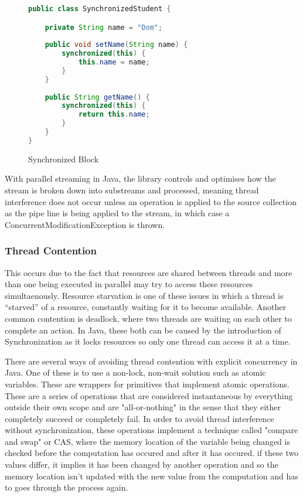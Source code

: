 \documentclass[]{report}
\begin{document}
\begin{figure}[h!]
\caption{Synchronized Block}
\begin{lstlisting}[language=Java,frame=single]
public class SynchronizedStudent {

	private String name = "Dom";
	
	public void setName(String name) {
		synchronized(this) {
			this.name = name;
		}
	}
	
	public String getName() {
		synchronized(this) {
			return this.name;
		}
	}
}
\end{lstlisting}
\end{figure}
 
With parallel streaming in Java, the library controls and optimises how the stream is broken down into substreams and processed, meaning thread interference does not occur unless an operation is applied to the source collection as the pipe line is being applied to the stream, in which case a ConcurrentModificationException is thrown.\cite{Streaming Fork Join}

\subsubsection{Thread Contention} 
This occurs due to the fact that resources are shared between threads and more than one  being executed in parallel may try to access these resources simultaenously. Resource starvation is one of these issues in which a thread is “starved” of a resource, constantly waiting for it to become available\cite{Starvation}. Another common contention is deadlock, where two threads are waiting on each other to complete an action. In Java, these both can be caused by the introduction of Synchronization as it locks resources so only one thread can access it at a time.\cite{Synchronization}

There are several ways of avoiding thread contention with explicit concurrency in Java. One of these is to use a non-lock, non-wait solution such as atomic variables. These are wrappers for primitives that implement atomic operations. These are a series of operations that are considered instantaneous by everything outside their own scope and are "all-or-nothing" in the sense that they either completely succeed or completely fail.\cite{Atomic Variables} In order to avoid thread interference without synchronization, these operations implement a technique called "compare and swap" or CAS, where the memory location of the variable being changed is checked before the computation has occured and after it has occured. if these two values differ, it implies it has been changed by another operation and so the memory location isn't updated with the new value from the computation and has to goes through the process again.\cite{Compare Swap}
\end{document}
